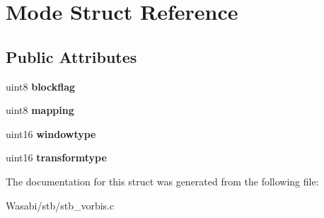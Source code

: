 \hypertarget{struct_mode}{}\section{Mode Struct Reference}
\label{struct_mode}
\subsection*{Public Attributes}
\begin{DoxyCompactItemize}
\item 
uint8 {\bfseries blockflag}\hypertarget{struct_mode_abc3023110a01eb21ac915398246c5868}{}\label{struct_mode_abc3023110a01eb21ac915398246c5868}

\item 
uint8 {\bfseries mapping}\hypertarget{struct_mode_a56d2ce10834c4f563f402359db99af9f}{}\label{struct_mode_a56d2ce10834c4f563f402359db99af9f}

\item 
uint16 {\bfseries windowtype}\hypertarget{struct_mode_a000084125ae3760f66182ab4adae705e}{}\label{struct_mode_a000084125ae3760f66182ab4adae705e}

\item 
uint16 {\bfseries transformtype}\hypertarget{struct_mode_a2f78100869ebed55b17f89e6a0202aac}{}\label{struct_mode_a2f78100869ebed55b17f89e6a0202aac}

\end{DoxyCompactItemize}


The documentation for this struct was generated from the following file\+:\begin{DoxyCompactItemize}
\item 
Wasabi/stb/stb\+\_\+vorbis.\+c\end{DoxyCompactItemize}
